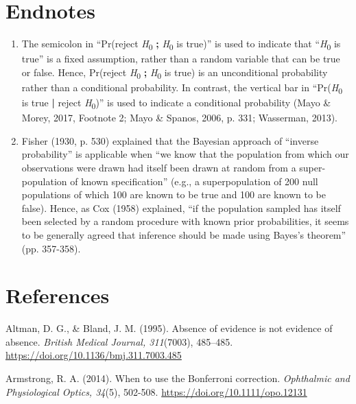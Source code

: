\documentclass[authordate, empirical]{jote-new-article}
\begin{document}
	\section{Endnotes}

	\begin{enumerate}


		\item The semicolon in “Pr(reject \emph{H}\textsubscript{0 }\textbf{; }\emph{H}\textsubscript{0} is true)” is used to indicate that “\emph{H}\textsubscript{0} is true” is a fixed assumption, rather than a random variable that can be true or false. Hence, Pr(reject \emph{H}\textsubscript{0 }\textbf{; }\emph{H}\textsubscript{0} is true) is an unconditional probability rather than a conditional probability. In contrast, the vertical bar in “Pr(\emph{H}\textsubscript{0} is true \textbf{| }reject \emph{H}\textsubscript{0})” is used to indicate a conditional probability (Mayo \& Morey, 2017, Footnote 2; Mayo \& Spanos, 2006, p. 331; Wasserman, 2013).



		\item
		Fisher (1930, p. 530) explained that the Bayesian approach of “inverse probability” is applicable when “we know that the population from which our observations were drawn had itself been drawn at random from a super-population of known specification” (e.g., a superpopulation of 200 null populations of which 100 are known to be true and 100 are known to be false). Hence, as Cox (1958) explained, “if the population sampled has itself been selected by a random procedure with known prior probabilities, it seems to be generally agreed that inference should be made using Bayes's theorem” (pp. 357-358).


	\end{enumerate}





	\section{References}



	Altman, D. G., \& Bland, J. M. (1995). Absence of evidence is not evidence of absence. \emph{British Medical Journal, 311}(7003), 485--485. \href{https://doi.org/10.1136/bmj.311.7003.485}{https://doi.org/10.1136/bmj.311.7003.485}



	Armstrong, R. A. (2014). When to use the Bonferroni correction. \emph{Ophthalmic and Physiological Optics, 34}(5), 502-508. \href{https://doi.org/10.1111/opo.12131}{https://doi.org/10.1111/opo.12131}
\end{document}
